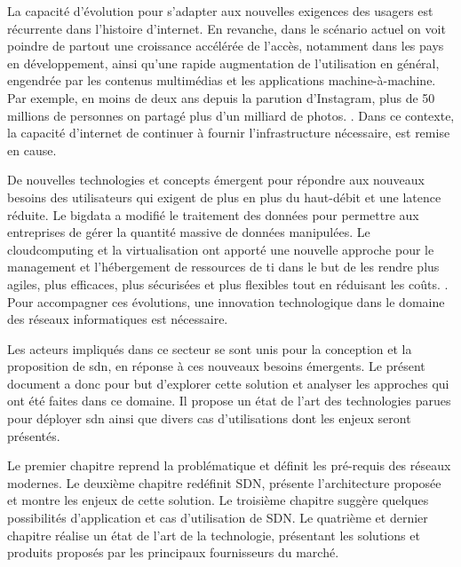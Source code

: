 \par
La capacité d'évolution pour s'adapter aux nouvelles exigences des usagers est récurrente dans l'histoire d'internet. 
En revanche, dans le scénario actuel on voit poindre de partout une croissance accélérée de l'accès, notamment dans les pays en développement, ainsi qu'une rapide augmentation de l'utilisation en général, engendrée par les contenus multimédias et les applications machine-à-machine. Par exemple, en moins de deux ans depuis la parution d'Instagram, plus de 50 millions de personnes on partagé plus d'un milliard de photos. \cite{deuxAnsInstagram}.
Dans ce contexte, la capacité d'internet de continuer à fournir l'infrastructure nécessaire, est remise en cause. \cite{InternetSustainGrowthIntro}
\par
De nouvelles technologies et concepts émergent pour répondre aux nouveaux besoins des utilisateurs qui exigent de plus en plus du haut-débit et une latence réduite. Le \gls{bigdata} a modifié le traitement des données pour permettre aux entreprises de gérer la quantité massive de données manipulées. \cite{IMBigData} Le \gls{cloudcomputing} et la \gls{virtualisation} ont apporté une nouvelle approche pour le management et l'hébergement de ressources de \gls{ti} dans le but de les rendre plus agiles, plus efficaces, plus sécurisées et plus flexibles tout en réduisant les coûts. \cite{CloudComputingIntelVision}. Pour accompagner ces évolutions, une innovation technologique dans le domaine des réseaux informatiques est nécessaire. \cite{InternetEvolutionRoleSoftwareEngineeringConclusion}
\par
Les acteurs impliqués dans ce secteur se sont unis pour la conception et la proposition de \gls{sdn}, en réponse à ces nouveaux besoins émergents. 
Le présent document a donc pour but d'explorer cette solution et analyser les approches qui ont été faites dans ce domaine. Il propose un état de l'art des technologies parues pour déployer \gls{sdn} ainsi que divers cas d'utilisations dont les enjeux seront présentés.
\par
Le premier chapitre reprend la problématique et définit les pré-requis des réseaux modernes. Le deuxième chapitre redéfinit SDN, présente l'architecture proposée et montre les enjeux de cette solution. Le troisième chapitre suggère quelques possibilités d'application et cas d'utilisation de SDN. Le quatrième et dernier chapitre réalise un état de l'art de la technologie, présentant les solutions et produits proposés par les principaux fournisseurs du marché.


